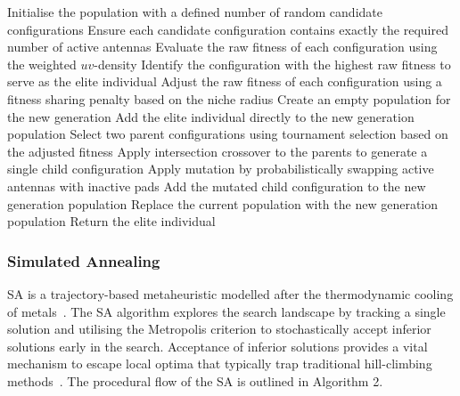 \documentclass[conference]{IEEEtran}
\begin{document}
\begin{algorithm}[htbp]
\caption{Genetic Algorithm incorporating fitness sharing, intersection crossover, and elitism.}
\begin{algorithmic}[1]
\State Initialise the population with a defined number of random candidate configurations
\State Ensure each candidate configuration contains exactly the required number of active antennas
    \State Evaluate the raw fitness of each configuration using the weighted $uv$-density
    \State Identify the configuration with the highest raw fitness to serve as the elite individual
    \State Adjust the raw fitness of each configuration using a fitness sharing penalty based on the niche radius
    \State Create an empty population for the new generation
    \State Add the elite individual directly to the new generation population
        \State Select two parent configurations using tournament selection based on the adjusted fitness
        \State Apply intersection crossover to the parents to generate a single child configuration
        \State Apply mutation by probabilistically swapping active antennas with inactive pads
        \State Add the mutated child configuration to the new generation population
    \EndWhile
    \State Replace the current population with the new generation population
\EndWhile
\State Return the elite individual
\end{algorithmic}
\end{algorithm}

\subsubsection{Simulated Annealing}
SA is a trajectory-based metaheuristic modelled after 
the thermodynamic cooling of metals~\cite{engelbrecht2007}. The SA algorithm explores the search landscape 
by tracking a single solution and utilising the Metropolis criterion to stochastically accept 
inferior solutions early in the search. Acceptance of inferior solutions provides a vital 
mechanism to escape local optima that typically trap traditional hill-climbing methods~\cite{engelbrecht2007}. 
The procedural flow of the SA is outlined in Algorithm 2.
\end{document}
